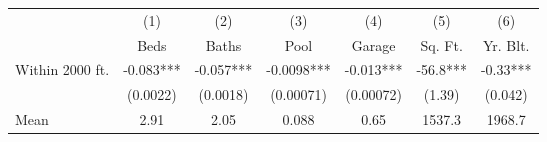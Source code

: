{
\def\sym#1{\ifmmode^{#1}\else\(^{#1}\)\fi}
\begin{tabular}{l*{6}{c}}
\toprule
                    &\multicolumn{1}{c}{(1)}&\multicolumn{1}{c}{(2)}&\multicolumn{1}{c}{(3)}&\multicolumn{1}{c}{(4)}&\multicolumn{1}{c}{(5)}&\multicolumn{1}{c}{(6)}\\
                    &\multicolumn{1}{c}{Beds}&\multicolumn{1}{c}{Baths}&\multicolumn{1}{c}{Pool}&\multicolumn{1}{c}{Garage}&\multicolumn{1}{c}{Sq. Ft.}&\multicolumn{1}{c}{Yr. Blt.}\\
\midrule
Within 2000 ft.     &      -0.083***&      -0.057***&     -0.0098***&      -0.013***&       -56.8***&       -0.33***\\
                    &    (0.0022)   &    (0.0018)   &   (0.00071)   &   (0.00072)   &      (1.39)   &     (0.042)   \\
\midrule
Mean                &        2.91   &        2.05   &       0.088   &        0.65   &      1537.3   &      1968.7   \\
\bottomrule
\end{tabular}
}
